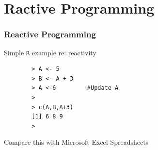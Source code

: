 \documentclass{beamer}
\begin{document}
\section{Ractive Programming}
\begin{frame}[fragile]
	\Large
	\frametitle{Reactive Programming}
	
	Simple \texttt{R} example re: reactivity
	\begin{framed}
		\begin{verbatim}
		> A <- 5
		> B <- A + 3
		> A <-6         #Update A
		>
		> c(A,B,A+3)
		[1] 6 8 9
		>
		\end{verbatim}
	\end{framed}
	Compare this with Microsoft Excel Spreadsheets
\end{frame}
\end{document}
